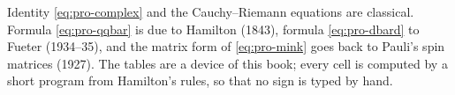 \begin{sources}
Identity \eqref{eq:pro-complex} and the Cauchy--Riemann equations are classical. Formula \eqref{eq:pro-qqbar} is due to Hamilton (1843), formula \eqref{eq:pro-dbard} to Fueter (1934--35), and the matrix form of \eqref{eq:pro-mink} goes back to Pauli's spin matrices (1927). The tables are a device of this book; every cell is computed by a short program from Hamilton's rules, so that no sign is typed by hand.
\end{sources}
